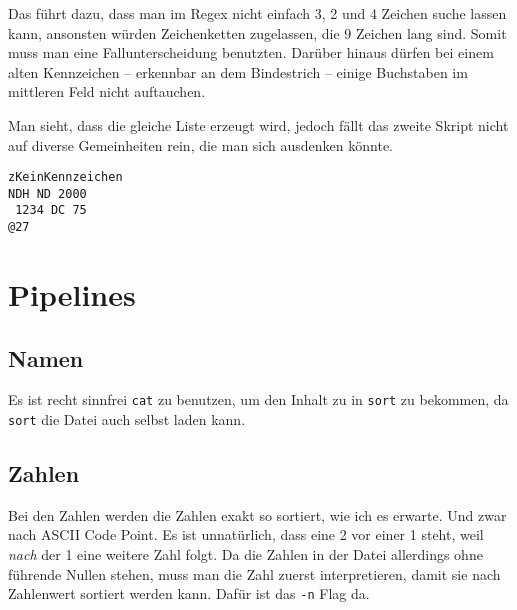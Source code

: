 \documentclass[12pt]{report}
\begin{document}
Das führt dazu, dass man im Regex nicht einfach 3, 2 und 4 Zeichen suche lassen kann, ansonsten würden Zeichenketten zugelassen, die 9 Zeichen lang sind. Somit muss man eine Fallunterscheidung benutzten. Darüber hinaus dürfen bei einem alten Kennzeichen -- erkennbar an dem Bindestrich -- einige Buchstaben im mittleren Feld nicht auftauchen.





Man sieht, dass die gleiche Liste erzeugt wird, jedoch fällt das zweite Skript nicht auf diverse Gemeinheiten rein, die man sich ausdenken könnte.

\begin{lstlisting}[caption=Gemeinheiten für Listing \ref{listing:auto-einfach}]
zKeinKennzeichen
NDH ND 2000
 1234 DC 75
@27
\end{lstlisting}

\section{Pipelines}
\subsection{Namen}


Es ist recht sinnfrei \texttt{cat} zu benutzen, um den Inhalt zu in \texttt{sort} zu bekommen, da \texttt{sort} die Datei auch selbst laden kann.




\subsection{Zahlen}



Bei den Zahlen werden die Zahlen exakt so sortiert, wie ich es erwarte. Und zwar nach ASCII Code Point. Es ist unnatürlich, dass eine 2 vor einer 1 steht, weil \textit{nach} der 1 eine weitere Zahl folgt. Da die Zahlen in der Datei allerdings ohne führende Nullen stehen, muss man die Zahl zuerst interpretieren, damit sie nach Zahlenwert sortiert werden kann. Dafür ist das \texttt{-n} Flag da.
\end{document}
